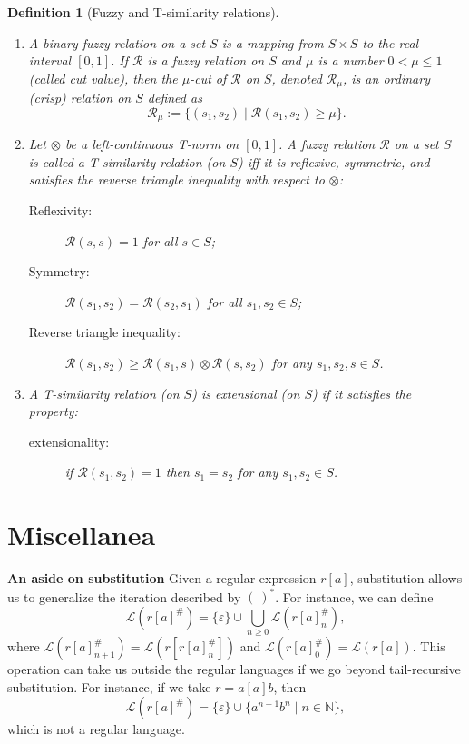 \documentclass{article}
\newcommand{\cR}{{\mathcal R}}
\def\cut{\mu}
\newtheorem{definition}{Definition}[section]
\begin{document}
\begin{definition}[Fuzzy and T-similarity relations]\label{def:fuzzy-relation}
\hfill
\begin{enumerate}
\item A binary \emph{fuzzy relation} on a set $S$ is a mapping from $S\times S$ to the real interval $[0,1]$. If $\cR$ is a fuzzy relation on $S$ and $\cut$ is a number $0<\cut \le 1$ (called \emph{cut value}), then the \emph{$\cut$-cut} of $\cR$ on $S$, denoted $\cR_\cut$, is an ordinary (crisp) relation on $S$ defined as
\[
  \cR_\cut := \{(s_1,s_2) \mid \cR(s_1,s_2) \ge \cut \}.
\]
\item Let $\otimes$ be a left-continuous T-norm on $[0,1]$.
A fuzzy relation $\cR$ on a set $S$ is
called a \emph{T-similarity relation} (on $S$) iff it is reflexive, symmetric, and satisfies the reverse
triangle inequality with respect to $\otimes$:
\begin{description}
  \item[Reflexivity:] $\cR(s,s)=1$ for all $s\in S$;
  \item[Symmetry:] $\cR(s_1,s_2)=\cR(s_2,s_1)$ for all $s_1,s_2\in S$;
  \item[Reverse triangle inequality:] $\cR(s_1,s_2)\ge \cR(s_1,s) \otimes \cR(s,s_2)$ for any $s_1,s_2,s\in S$.
\end{description}
\item A T-similarity relation (on $S$) is
\emph{extensional} (on $S$) if it satisfies the property: 
\begin{description}
  \item [extensionality:] if $\cR(s_1,s_2)=1 $ then $s_1=s_2$ for any $s_1,s_2\in S$.
\end{description}
\end{enumerate}
\end{definition}
\section{Miscellanea}
{\bf An aside on substitution} \label{extension}
Given a regular expression $r[a]$, substitution allows us to generalize the iteration described by $(\ )^*$. For instance, we can define
\[
\mathcal{L}(r[a]^\#)= \{\varepsilon\}\cup \bigcup_{n \geq 0} \mathcal{L}(r[a]^\#_n),
\]
where $\mathcal L(r[a]^\#_{n+1})=\mathcal L(r[r[a]^\#_n])$ and
$\mathcal{L}(r[a]^\#_0)=\mathcal L(r[a])$. This operation can take us outside the regular languages if we go beyond tail-recursive substitution. For instance, if we take $r=a[a]b$, then
\[
\mathcal{L}(r[a]^\#)= \{\varepsilon\}\cup \{ a^{n+1}b^n\mid n\in \mathbb{N}\},
\]
which is not a regular language.





















\end{document}
